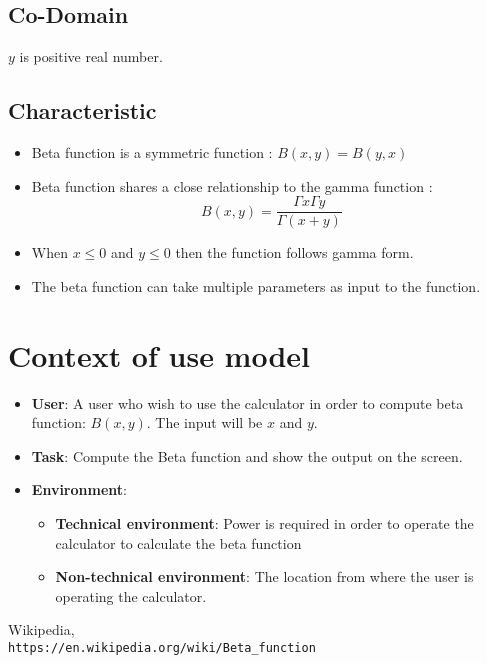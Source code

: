\documentclass[12pt]{report}
\begin{document}
\subsection{Co-Domain}  
$y$ is positive real number.


\subsection{Characteristic}
\begin{itemize}
    \item Beta function is a symmetric function : $ B(x,y) = B(y,x) $
    \item Beta function shares a close relationship to the gamma function :  $$ B(x,y)=\frac{\Gamma x \Gamma y}{\Gamma (x+y)}$$
    \item When $ x \leq 0 $ and $ y \leq 0 $ then the function follows gamma form.
    \item The beta function can take multiple parameters as input to the function.
\end{itemize}


\newpage
\section{Context of use model}
\begin{itemize}
    \item 
    \textbf{User}: A user who wish to use the calculator in order to compute beta function: $B(x,y)$. The input will be $x$ and $y$.
    \item
    \textbf{Task}: Compute the Beta function and show the output on the screen.
    \item
    \textbf{Environment}:
    \begin{itemize}
    \item \textbf{Technical environment}:
    Power is required in order to operate the calculator to calculate the beta function
    \item \textbf{Non-technical environment}:
    The location from where the user is operating the calculator.
    \end{itemize}
\end{itemize}

\begin{thebibliography}{4}
Wikipedia,
\\\texttt{https://en.wikipedia.org/wiki/Beta\_function}

\end{thebibliography}
\end{document}
